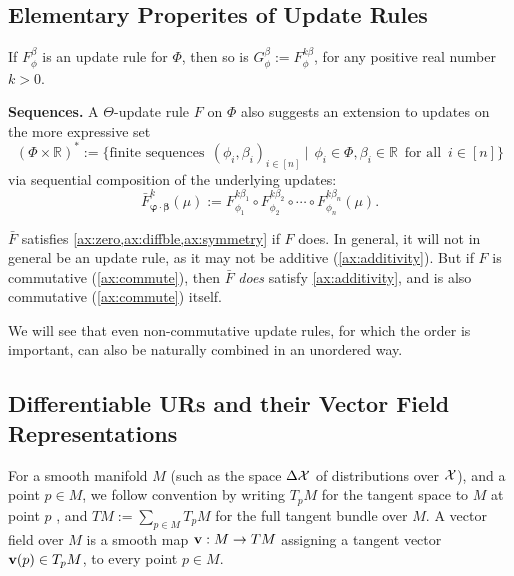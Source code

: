 \documentclass{article}
\begin{document}
\subsection{Elementary Properites of Update Rules}
\begin{prop}
    If $F^{\beta}_\phi$ is an update rule for $\Phi$, then so is
    $G^{\beta}_\phi := F^{k \beta}_\phi$, for any positive real number $k > 0$.
        \label{prop:rescale}
\end{prop}


\textbf{Sequences.}
A $\Theta$-update rule $F$ on $\Phi$ also suggests an extension to updates on the more expressive set
\[
(\Phi \times \mathbb R)^* := \Big\{
    \text{finite sequences}~
    ~ (\phi_i, \beta_i)_{i \in [n]}
    ~\Big|~
    ~ \phi_i \in \Phi, \beta_i \in \mathbb R \,\text{ for all }\, i \in
        [n]
    \Big\}
\]
via sequential composition of the underlying updates:
\[
    \bar F^{k}_{\boldsymbol \varphi \cdot \boldsymbol\beta}
        (\mu) := F^{k \beta_1}_{\phi_1} \circ F^{k \beta_2}_{\phi_2}
            \circ \cdots\circ F^{k \beta_n}_{\phi_n}(\mu).
\]

$\bar F$ satisfies \cref{ax:zero,ax:diffble,ax:symmetry} if $F$ does.
In general, it will not in general be an update rule, as it may not be additive (\cref{ax:additivity}). But if $F$ is commutative (\cref{ax:commute}), then $\bar F$ \emph{does} satisfy \cref{ax:additivity}, and is also commutative (\cref{ax:commute}) itself.


We will see that even non-commutative update rules, for which the order is important, can also be naturally combined in an unordered way.

\subsection{Differentiable URs and their Vector Field Representations}
    \label{sec:vecrep}
For a smooth manifold $M$
(such as the space $\Delta \mathcal X$ of distributions over $\mathcal X$),
and a point $p \in M$, we follow convention by writing $T_p M$ for the tangent space to $M$ at point $p$ \parencite{lee2013smooth}, and %
$TM := \sum_{p \in M} T_p M$ for the full tangent bundle over $M$.
%
A vector field over $M$ is a smooth map $\mathbf{v} : M \to T M$ assigning a tangent vector $\mathbf{v}(p) \in T_p M$, to every point $p \in M$.
\end{document}
